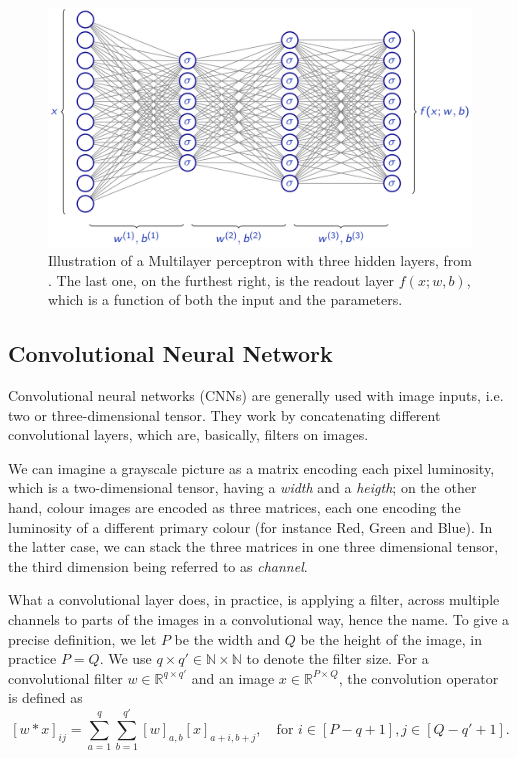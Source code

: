 \documentclass[11pt,notitlepage]{article}
\numberwithin{equation}{section}
\def\R{{\mathbb{R}}}
\theoremstyle{remark}
\theoremstyle{definition}
\begin{document}
	\begin{figure}
		\centering
		\includegraphics[width=.75\linewidth]{Figures/fully_connected.png}
		\caption{Illustration of a Multilayer perceptron with three hidden layers, from \cite{fleuret2019deep}.
			The last one, on the furthest right, is the readout layer $f(x; w, b)$, which is a function of both the input and the parameters.}
		\label{fig:fullyConnected}
	\end{figure}
	
	\subsection{Convolutional Neural Network}
	Convolutional neural networks (CNNs) are generally used with image inputs, i.e. two or three-dimensional tensor.
	They work by concatenating different convolutional layers, which are, basically, filters on images.
	
	We can imagine a grayscale picture as a matrix encoding each pixel luminosity, which is a two-dimensional tensor, having a \emph{width} and a \emph{heigth}; on the other hand, colour images are encoded as three matrices, each one encoding the luminosity of a different primary colour (for instance Red, Green and Blue).
	In the latter case, we can stack the three matrices in one three dimensional tensor, the third dimension being referred to as \emph{channel}.
	
	What a convolutional layer does, in practice, is applying a filter, across multiple channels to parts of the images in a convolutional way, hence the name.
	To give a precise definition, we let $P$ be the width and $Q$ be the height of the image, in practice $P=Q$.
	We use $q \times q' \in \mathbb{N} \times \mathbb{N}$ to denote the filter size.
	For a convolutional filter $w \in  \R^{q \times q' }$ and an image $x \in \R^{P \times Q} $, the convolution operator is defined as
	\begin{equation}\label{eq:convolution}
	[w * x]_{ij} = \sum_{a=1}^{q} \sum_{b=1}^{q'}
	[w]_{a, b}[x]_{a+i, b+j}, \quad \text{for } i\in [P - q + 1], j \in [Q - q' + 1].
	\end{equation}
	
\end{document}
